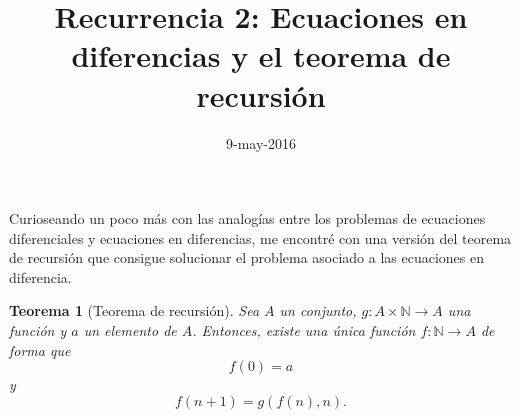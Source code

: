 \documentclass[letter,10pt,notitlepage]{amsart}
\title{Recurrencia 2: Ecuaciones en diferencias y el teorema de recursión}
\date{9-may-2016}
\newtheorem{theorem}{Teorema}
\theoremstyle{definition}
\theoremstyle{remark}
\begin{document}
\maketitle


Curioseando un poco más con las analogías entre los
problemas de ecuaciones diferenciales y ecuaciones en diferencias,
me encontré con una versión del teorema de recursión que
consigue solucionar el problema asociado a las ecuaciones
en diferencia.

\begin{theorem}[Teorema de recursión]
  Sea \( A\) un conjunto, \( g \colon A \times \mathbb{N} \to A\)
  una función y \( a\) un elemento de \( A\). Entonces,
  existe una única función \( f \colon \mathbb{N} \to A\) de
  forma que \[f(0) = a\] y \[ f(n+1)=g\left( f(n),n \right).\]
\end{theorem}
\end{document}
